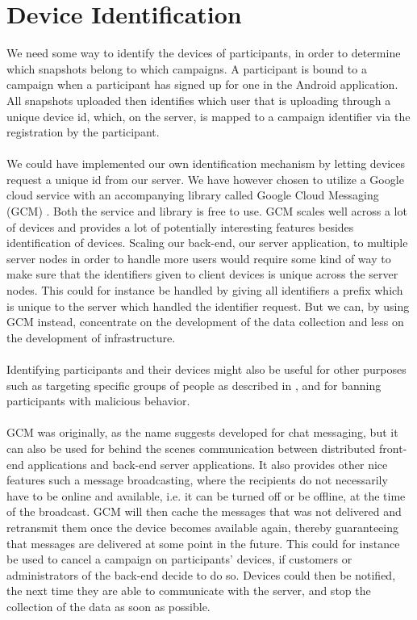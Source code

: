 
\section{Device Identification}
\label{sec:device_identification}

We need some way to identify the devices of participants, in order to determine which snapshots belong to which campaigns. A participant is bound to a campaign when a participant has signed up for one in the Android application. All snapshots uploaded then identifies which user that is uploading through a unique device id, which, on the server, is mapped to a campaign identifier via the registration by the participant. 
\\\\
We could have implemented our own identification mechanism by letting devices request a unique id from our server. We have however chosen to utilize a Google cloud service with an accompanying library called Google Cloud Messaging (GCM) \parencite{google_cloud_messaging}. Both the service and library is free to use. GCM scales well across a lot of devices and provides a lot of potentially interesting features besides identification of devices. Scaling our back-end, our server application, to multiple server nodes in order to handle more users would require some kind of way to make sure that the identifiers given to client devices is unique across the server nodes. This could for instance be handled by giving all identifiers a prefix which is unique to the server which handled the identifier request. But we can, by using GCM instead, concentrate on the development of the data collection and less on the development of infrastructure.
\\\\
Identifying participants and their devices might also be useful for other purposes such as targeting specific groups of people as described in , and for banning participants with malicious behavior. 
\\\\
GCM was originally, as the name suggests developed for chat messaging, but it can also be used for behind the scenes communication between distributed front-end applications and back-end server applications. It also provides other nice features such a message broadcasting, where the recipients do not necessarily have to be online and available, i.e. it can be turned off or be offline, at the time of the broadcast. GCM will then cache the messages that was not delivered and retransmit them once the device becomes available again, thereby guaranteeing that messages are delivered at some point in the future. This could for instance be used to cancel a campaign on participants' devices, if customers or administrators of the back-end decide to do so. Devices could then be notified, the next time they are able to communicate with the server, and stop the collection of the data as soon as possible. 